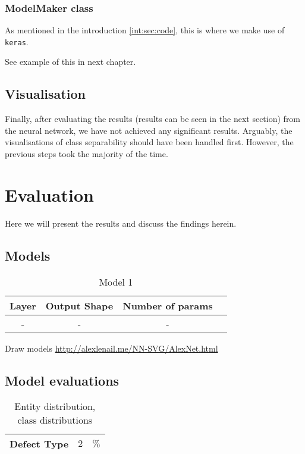 \subsection{ModelMaker class}
As mentioned in the introduction \ref{int:sec:code}, this is where we make use of \verb|keras|.

See example of this in next chapter. 

\section{Visualisation}
Finally, after evaluating the results (results can be seen in the next section) from the neural network, we have not achieved any significant results. Arguably, the visualisations of class separability should have been handled first. However, the previous steps took the majority of the time.

\chapter{Evaluation}
Here we will present the results and discuss the findings herein.


\section{Models}
\begin{table}[H]
	\centering
	\begin{tabular}{|c|c|c| c|} \hline
		\textbf{Layer} & \textbf{Output Shape } & \textbf{Number of params} \\ \hline \hline 
		- & - &  -  \\ \hline 
	\end{tabular}
	\caption{Model 1}
	\label{datasets}
\end{table}

Draw models \url{http://alexlenail.me/NN-SVG/AlexNet.html} 

\section{Model evaluations}

\begin{table}[H]
	\centering
	\begin{tabular}{|c|c|c|} \hline
		\textbf{Defect Type} & $2$ & $ \%$\\ \hline
	\end{tabular}
	\caption{Entity distribution, class distributions}
\end{table}

